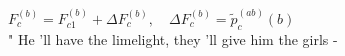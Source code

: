 \documentclass{article}
\begin{document}
        \(F _ { c } ^ { ( b ) } = F _ { c 1 } ^ { ( b ) } + \Delta F _ { c } ^ { ( b ) }, \quad \Delta F _ { c } ^ { ( b ) } = \tilde { p } _ { c } ^ { ( a b ) } ( b )\) \\ " He 'll have the limelight, they 'll give him the girls -
        
\end{document}
